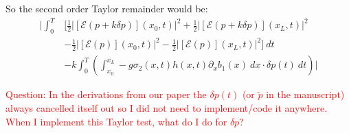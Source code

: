 \documentclass{article}
\begin{document}
So the second order Taylor remainder would be:
\begin{equation}\label{taylor_1}
\begin{split}
    \Bigg|\int_0^T  & \bigg[ \frac{1}{2}\left|\left[\mathcal{E}(p+k \delta p)\right](x_0,t)\right|^2 
    + \frac{1}{2}\left|\left[\mathcal{E}(p+k \delta p)\right](x_L,t)\right|^2 \\
    & - \frac{1}{2}\left|\left[\mathcal{E}(p)\right](x_0,t)\right|^2 
    - \frac{1}{2}\left|\left[\mathcal{E}(p)\right](x_L,t)\right|^2 \bigg] \ dt \\
    & - k \int_0^T\left(\int_{x_0}^{x_L} -g \sigma_2(x,t) h(x,t) \partial_x b_1(x) \ dx \cdot \delta p(t) \ dt \right)\Bigg| 
\end{split}
\end{equation}

\textcolor{red}{Question: In the derivations from our paper the $\delta p(t)$ (or $\tilde{p}$ in the manuscript) always cancelled itself out so I did not need to implement/code it anywhere. When I implement this Taylor test, what do I do for $\delta p$?}
\end{document}
